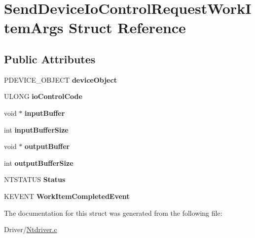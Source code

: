 \hypertarget{struct_send_device_io_control_request_work_item_args}{}\section{Send\+Device\+Io\+Control\+Request\+Work\+Item\+Args Struct Reference}
\label{struct_send_device_io_control_request_work_item_args}
\subsection*{Public Attributes}
\begin{DoxyCompactItemize}
\item 
\mbox{\label{struct_send_device_io_control_request_work_item_args_aaeb6c1ddb251b92876caba4a8b6f20f0}} 
P\+D\+E\+V\+I\+C\+E\+\_\+\+O\+B\+J\+E\+CT {\bfseries device\+Object}
\item 
\mbox{\label{struct_send_device_io_control_request_work_item_args_a22a8a19f70df0a513b86ea6ee131017c}} 
U\+L\+O\+NG {\bfseries io\+Control\+Code}
\item 
\mbox{\label{struct_send_device_io_control_request_work_item_args_a50782252db32eb018533489f42fe3b0d}} 
void $\ast$ {\bfseries input\+Buffer}
\item 
\mbox{\label{struct_send_device_io_control_request_work_item_args_af8a46f3270b4ba14a194d6e3f9f40db4}} 
int {\bfseries input\+Buffer\+Size}
\item 
\mbox{\label{struct_send_device_io_control_request_work_item_args_a9651e543be6167aed4d78882ba63cb54}} 
void $\ast$ {\bfseries output\+Buffer}
\item 
\mbox{\label{struct_send_device_io_control_request_work_item_args_aba8685a7500b301ce10f1b1ed65e33ca}} 
int {\bfseries output\+Buffer\+Size}
\item 
\mbox{\label{struct_send_device_io_control_request_work_item_args_a4340cd84ec6fdba22d015267d9826218}} 
N\+T\+S\+T\+A\+T\+US {\bfseries Status}
\item 
\mbox{\label{struct_send_device_io_control_request_work_item_args_a9ed0f0a272f10a0cc6da9bd5984f1daa}} 
K\+E\+V\+E\+NT {\bfseries Work\+Item\+Completed\+Event}
\end{DoxyCompactItemize}


The documentation for this struct was generated from the following file\+:\begin{DoxyCompactItemize}
\item 
Driver/\hyperlink{_ntdriver_8c}{Ntdriver.\+c}\end{DoxyCompactItemize}
